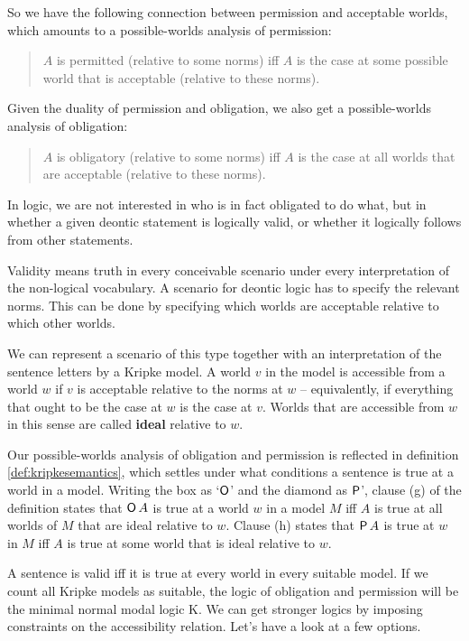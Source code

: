So we have the following connection between permission and acceptable worlds,
which amounts to a possible-worlds analysis of permission:
\begin{quote}
  $A$ is permitted (relative to some norms) iff $A$ is the case at
  some possible world that is acceptable (relative to these norms).
\end{quote}
%
Given the duality of permission and obligation, we also get a possible-worlds
analysis of obligation:
%
\begin{quote}
  $A$ is obligatory (relative to some norms) iff $A$ is the case at
  all worlds that are acceptable (relative to these norms).
\end{quote}

In logic, we are not interested in who is in fact obligated to do what, but in
whether a given deontic statement is logically valid, or whether it logically
follows from other statements.

Validity means truth in every conceivable scenario under every interpretation of
the non-logical vocabulary. A scenario for deontic logic has to specify the
relevant norms. This can be done by specifying which worlds are acceptable
relative to which other worlds.

We can represent a scenario of this type together with an interpretation of the
sentence letters by a Kripke model. A world $v$ in the model is accessible from
a world $w$ if $v$ is acceptable relative to the norms at $w$ -- equivalently,
if everything that ought to be the case at $w$ is the case at $v$. Worlds that
are accessible from $w$ in this sense are called \textbf{ideal} relative to $w$.

Our possible-worlds analysis of obligation and permission is reflected in
definition \ref{def:kripkesemantics}, which settles under what conditions a
sentence is true at a world in a model. Writing the box as `$\operatorname{\mathsf{O}}$' and the
diamond as $\operatorname{\mathsf{P}}$', clause (g) of the definition states that $\operatorname{\mathsf{O}} A$ is true at a
world $w$ in a model $M$ iff $A$ is true at all worlds of $M$ that are ideal
relative to $w$. Clause (h) states that $\operatorname{\mathsf{P}} A$ is true at $w$ in $M$ iff $A$ is
true at some world that is ideal relative to $w$.

A sentence is valid iff it is true at every world in every suitable model. If we
count all Kripke models as suitable, the logic of obligation and permission will
be the minimal normal modal logic K. We can get stronger logics by imposing
constraints on the accessibility relation. Let's have a look at a few options.

